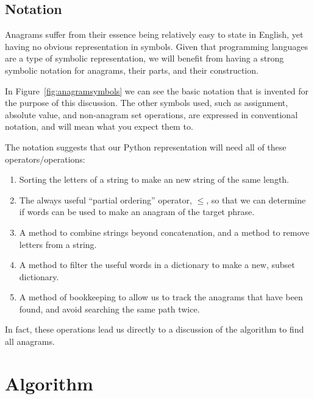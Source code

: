 \documentclass[letterpaper, 11pt]{article}
\newcommand{\D}{$\mathfrak{D}$\xspace}
\begin{document}
\begin{samepage}
\section{Notation}

Anagrams suffer from their essence being relatively easy to state
in English, yet having no obvious representation in symbols. Given
that programming languages are a type of symbolic representation,
we will benefit from having a strong symbolic notation for anagrams,
their parts, and their construction.
\end{samepage}

In Figure~\ref{fig:anagramsymbols} we can see the basic notation
that is invented for the purpose of this discussion. The other
symbols used, such as assignment, absolute value, and non-anagram
set operations, are expressed in conventional notation, and will
mean what you expect them to.

The notation suggests that our Python representation will need all
of these operators/operations:

\begin{enumerate}
\item Sorting the letters of a string to make an new string of the 
same length.

\item The always useful ``partial ordering'' operator, $\leq$, so that
we can determine if words can be used to make an anagram of the target
phrase.

\item A method to combine strings beyond concatenation, and a method
to remove letters from a string.

\item A method to filter the useful words in a dictionary to make
a new, subset dictionary.

\item A method of bookkeeping to allow us to track the anagrams that
have been found, and avoid searching the same path twice.
\end{enumerate}

In fact, these operations lead us directly to a discussion of the 
algorithm to find all anagrams. 

\newpage
\section{Algorithm}

\end{document}
